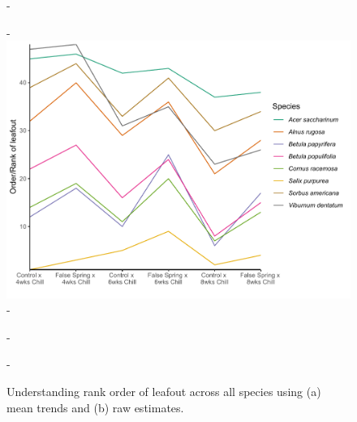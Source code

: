 \documentclass{article}\usepackage[]{graphicx}\usepackage[]{color}
\begin{document}
  {\begin{figure} [H]
  -\begin{center}
  -\includegraphics[width=12cm]{..//analyses/figures/leafoutorder_byrank.pdf} 
  -\caption{Understanding rank order of leafout across all species using (a) mean trends and (b) raw estimates. }\label{fig:rank}
  -\end{center}
  -\end{figure}}
  
\end{document}
